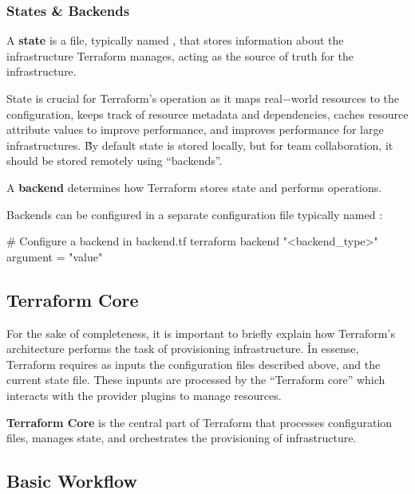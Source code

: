 \subsubsection{States \& Backends}

\bd[State]
A \textbf{state} is a file, typically named , that stores information about the infrastructure
Terraform manages, acting as the source of truth for the infrastructure.
\ed

State is crucial for Terraform's operation as it maps real$-$world resources to the configuration, keeps track of
resource metadata and dependencies, caches resource attribute values to improve performance, and improves performance
for large infrastructures. \v

By default state is stored locally, but for team collaboration, it should be stored remotely using ``backends''.

\bd[Backend]
A \textbf{backend} determines how Terraform stores state and performs operations.
\ed

Backends can be configured in a separate configuration file typically named :

\begin{block}
# Configure a backend in backend.tf
terraform {
    backend "<backend_type>" {
        argument = "value"
    }
}
\end{block}

\subsection{Terraform Core}

For the sake of completeness, it is important to briefly explain how Terraform's architecture performs the task of
provisioning infrastructure. \v

In essense, Terraform requires as inputs the configuration files described above, and the current state file. These
inpunts are processed by the ``Terraform core'' which interacts with the provider plugins to manage resources.

\textbf{Terraform Core} is the central part of Terraform that processes configuration files, manages state, and
orchestrates the provisioning of infrastructure.
\ed

\subsection{Basic Workflow}

